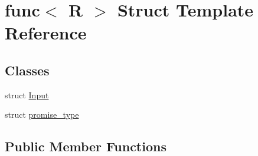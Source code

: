 \hypertarget{structfunc}{}\section{func$<$ R $>$ Struct Template Reference}
\label{structfunc}
\subsection*{Classes}
\begin{DoxyCompactItemize}
\item 
struct \mbox{\hyperlink{structfunc_1_1_input}{Input}}
\item 
struct \mbox{\hyperlink{structfunc_1_1promise__type}{promise\+\_\+type}}
\end{DoxyCompactItemize}
\subsection*{Public Member Functions}
